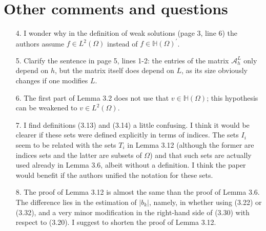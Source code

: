 \documentclass[11 pt]{article}
\numberwithin{equation}{section}
\begin{document}
\section*{Other comments and questions}

\begin{enumerate}
    \item[4.] I wonder why in the definition of weak solutions (page 3, line 6) the authors assume \(f\in L^{2}(\Omega)\) instead of \(f\in\mathbb{H}(\Omega)^{\prime}\).

    \item[5.] Clarify the sentence in page 5, lines 1-2: the entries of the matrix \({\mathcal{A}}_{h}^{L}\) only depend on \(h\), but the matrix itself does depend on \(L\), as its size obviously changes if one modifies \(L\).

    \item[6.] The first part of Lemma 3.2 does not use that \(v\in\mathbb{H}(\Omega)\); this hypothesis can be weakened to \(v\in L^{2}(\Omega)\).

    \item[7.] I find definitions (3.13) and (3.14) a little confusing. I think it would be clearer if these sets were defined explicitly in terms of indices. The sets \(I_{i}\) seem to be related with the sets \(T_{i}\) in Lemma 3.12 (although the former are indices sets and the latter are subsets of \(\Omega\)) and that such sets are actually used already in Lemma 3.6, albeit without a definition. I think the paper would benefit if the authors unified the notation for these sets.

    \item[8.] The proof of Lemma 3.12 is almost the same than the proof of Lemma 3.6. The difference lies in the estimation of \(|b_{k}|\), namely, in whether using (3.22) or (3.32), and a very minor modification in the right-hand side of (3.30) with respect to (3.20). I suggest to shorten the proof of Lemma 3.12.


\end{enumerate}
\end{document}
